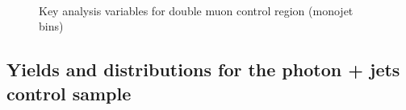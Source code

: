 \begin{figure}
\begin{center}
         \\
        \caption{Key analysis variables for double muon control region (monojet bins)}
        \label{fig:distribution_doublemu_mono}
    \end{center}
\end{figure}

\clearpage
\subsection{Yields and distributions for the photon + jets control sample}





